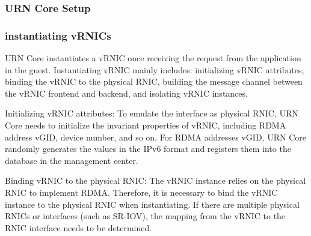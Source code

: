
\subsubsection{URN Core Setup}

\subsubsection{instantiating vRNICs}
URN Core instantiates a vRNIC once receiving the request from the application in the guest. Instantiating vRNIC mainly includes: initializing vRNIC attributes, binding the vRNIC to the physical RNIC, building the message channel between the vRNIC frontend and backend, and isolating vRNIC instances.

Initializing vRNIC attributes: To emulate the interface as physical RNIC, URN Core needs to initialize the invariant properties of vRNIC, including RDMA address vGID, device number, and so on. For RDMA addresses vGID, URN Core randomly generates the values in the IPv6 format and registers them into the database in the management center.

Binding vRNIC to the physical RNIC: The vRNIC instance relies on the physical RNIC to implement RDMA. Therefore, it is necessary to bind the vRNIC instance to the physical RNIC when instantiating. If there are multiple physical RNICs or interfaces (such as SR-IOV), the mapping from the vRNIC to the RNIC interface needs to be determined.

